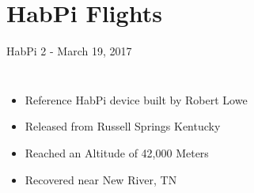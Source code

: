 \documentclass[handout]{beamer}
\begin{document}
\section{HabPi Flights}

\begin{frame}[t]{HabPi 2 - March 19, 2017}
    \begin{columns}[t]
        \begin{itemize}
            \item Reference HabPi device built by Robert Lowe
            \item Released from Russell Springs Kentucky
            \item Reached an Altitude of 42,000 Meters
            \item Recovered near New River, TN
        \end{itemize}


\end{columns}
\end{frame}
\end{document}
